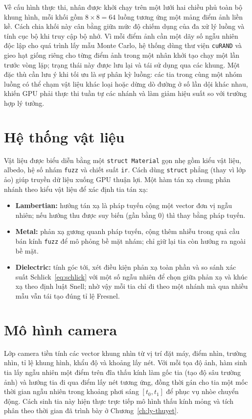 Về cấu hình thực thi, nhân được khởi chạy trên một lưới hai chiều phủ toàn bộ
khung hình, mỗi khối gồm $8\times8=64$ luồng tương ứng một mảng điểm ảnh liền kề.
Cách chia khối này cân bằng giữa mức độ chiếm dụng của đa xử lý luồng và tính cục
bộ khi truy cập bộ nhớ. Vì mỗi điểm ảnh cần một dãy số ngẫu nhiên độc lập cho quá
trình lấy mẫu Monte Carlo, hệ thống dùng thư viện \texttt{cuRAND} và gieo hạt
giống riêng cho từng điểm ảnh trong một nhân khởi tạo chạy một lần trước vòng lặp;
trạng thái này được lưu lại và tái sử dụng qua các khung. Một đặc thù cần lưu ý
khi tối ưu là sự phân kỳ luồng: các tia trong cùng một nhóm luồng có thể chạm vật
liệu khác loại hoặc dừng dò đường ở số lần dội khác nhau, khiến GPU phải thực thi
tuần tự các nhánh và làm giảm hiệu suất so với trường hợp lý tưởng.

\section{Hệ thống vật liệu}
Vật liệu được biểu diễn bằng một \texttt{struct Material} gọn nhẹ gồm kiểu vật
liệu, albedo, hệ số nhám \texttt{fuzz} và chiết suất \texttt{ir}. Cách dùng
\texttt{struct} phẳng (thay vì lớp ảo) giúp truyền dữ liệu xuống GPU thuận lợi.
Một hàm tán xạ chung phân nhánh theo kiểu vật liệu để xác định tia tán xạ:
\begin{itemize}[noitemsep]
  \item \textbf{Lambertian:} hướng tán xạ là pháp tuyến cộng một vector đơn vị
        ngẫu nhiên; nếu hướng thu được suy biến (gần bằng 0) thì thay bằng pháp
        tuyến.
  \item \textbf{Metal:} phản xạ gương quanh pháp tuyến, cộng thêm nhiễu trong quả
        cầu bán kính \texttt{fuzz} để mô phỏng bề mặt nhám; chỉ giữ lại tia còn
        hướng ra ngoài bề mặt.
  \item \textbf{Dielectric:} tính góc tới, xét điều kiện phản xạ toàn phần và so
        sánh xác suất Schlick~\eqref{eq:schlick} với một số ngẫu nhiên để chọn
        giữa phản xạ và khúc xạ theo định luật Snell; nhờ vậy mỗi tia chỉ đi theo
        một nhánh mà qua nhiều mẫu vẫn tái tạo đúng tỉ lệ Fresnel.
\end{itemize}

\section{Mô hình camera}
Lớp camera tiền tính các vector khung nhìn từ vị trí đặt máy, điểm nhìn, trường
nhìn, tỉ lệ khung hình, khẩu độ và khoảng lấy nét. Với mỗi tọa độ ảnh, hàm sinh
tia lấy ngẫu nhiên một điểm trên đĩa thấu kính làm gốc tia (tạo độ sâu trường
ảnh) và hướng tia đi qua điểm lấy nét tương ứng, đồng thời gán cho tia một mốc
thời gian ngẫu nhiên trong khoảng phơi sáng $[t_0, t_1]$ để phục vụ nhòe chuyển
động. Cách sinh tia này hiện thực trực tiếp mô hình thấu kính mỏng và tích phân
theo thời gian đã trình bày ở Chương~\ref{ch:ly-thuyet}.

